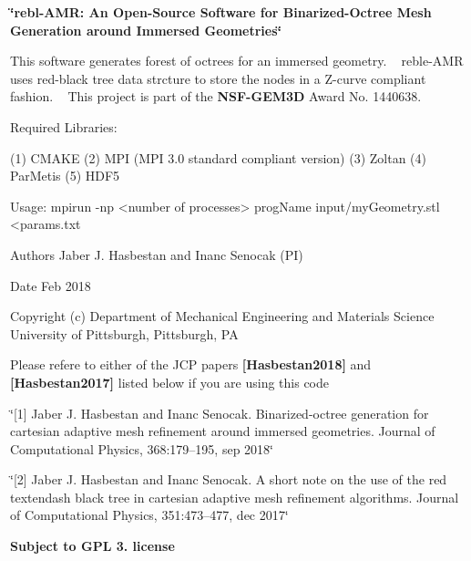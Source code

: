 {\bfseries  \char`\"{}rebl-\/\+A\+M\+R\+: An Open-\/\+Source Software for Binarized-\/\+Octree Mesh Generation around Immersed Geometries\char`\"{} }

This software generates forest of octrees for an immersed geometry. ~\newline
 reble-\/\+A\+MR uses red-\/black tree data strcture to store the nodes in a Z-\/curve compliant fashion. ~\newline
 This project is part of the {\bfseries N\+S\+F-\/\+G\+E\+M3D }Award No. 1440638. ~\newline
 \begin{DoxyVerb} Required Libraries:

 (1)  CMAKE
 (2)  MPI (MPI 3.0 standard compliant version)
 (3)  Zoltan
 (4)  ParMetis
 (5)  HDF5

 Usage:
 mpirun -np <number of processes> progName input/myGeometry.stl <params.txt
\end{DoxyVerb}


\begin{DoxyAuthor}{Authors}
Jaber J. Hasbestan and Inanc Senocak (PI) ~\newline

\end{DoxyAuthor}
\begin{DoxyDate}{Date}
Feb 2018
\end{DoxyDate}
\begin{DoxyCopyright}{Copyright}
(c) Department of Mechanical Engineering and Materials Science ~\newline
 University of Pittsburgh, Pittsburgh, PA ~\newline
 ~\newline

\end{DoxyCopyright}
Please refere to either of the J\+CP papers {\bfseries [Hasbestan2018]} and {\bfseries [Hasbestan2017]} listed below if you are using this code

\char`\"{}\mbox{[}1\mbox{]} Jaber J. Hasbestan and Inanc Senocak. Binarized-\/octree generation for cartesian adaptive mesh refinement around immersed geometries. Journal of Computational Physics, 368\+:179–195, sep 2018\char`\"{}

\char`\"{}\mbox{[}2\mbox{]} Jaber J. Hasbestan and Inanc Senocak. A short note on the use of the red textendash black tree in cartesian adaptive mesh refinement algorithms. Journal of Computational Physics, 351\+:473–477, dec 2017\char`\"{}



{\bfseries  Subject to G\+PL 3. license } 